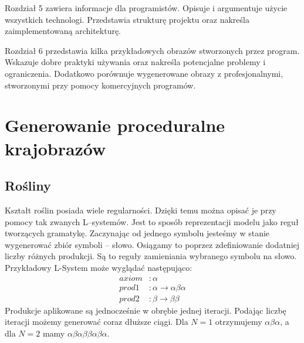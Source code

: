 \documentclass[inz,longabstract]{iithesis}
\begin{document}
    Rozdział 5 zawiera informacje dla programistów. Opisuje i argumentuje użycie wszystkich technologi. Przedstawia strukturę projektu oraz nakreśla zaimplementowaną architekturę.
    
    Rozdział 6 przedstawia kilka przykładowych obrazów stworzonych przez program. Wskazuje dobre praktyki używania oraz nakreśla potencjalne problemy i ograniczenia. Dodatkowo porównuje wygenerowane obrazy z profesjonalnymi, stworzonymi przy pomocy komercyjnych programów.  
    
    
    
\chapter{Generowanie proceduralne krajobrazów}

    \section{Rośliny}
        Kształt roślin posiada wiele regularności. Dzięki temu można opisać je przy pomocy tak zwanych L--systemów. Jest to sposób reprezentacji modelu jako reguł tworzących gramatykę. Zaczynając od jednego symbolu jesteśmy w stanie wygenerować zbiór symboli -- słowo. Osiągamy to poprzez zdefiniowanie dodatniej liczby różnych produkcji. Są to reguły zamieniania wybranego symbolu na słowo. Przykładowy L-System może wyglądać następująco:
        \begin{align*}
            axiom &: \alpha \\
            prod1 &: \alpha \rightarrow \alpha\beta\alpha \\
            prod2 &: \beta \rightarrow \beta\beta
        \end{align*}
        Produkcje aplikowane są jednocześnie w obrębie jednej iteracji. Podając liczbę iteracji możemy generować coraz dłuższe ciągi. Dla $N = 1$ otrzymujemy $\alpha\beta\alpha$, a dla $N = 2$ mamy $\alpha\beta\alpha\beta\beta\alpha\beta\alpha$.
        
\end{document}
